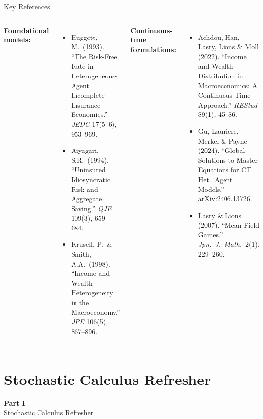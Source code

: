 \documentclass[aspectratio=169,11pt]{beamer}
\begin{document}
\begin{frame}{Key References}
\small
\begin{columns}[T]
\textbf{Foundational models:}
\begin{itemize}\itemsep2pt
    \item Huggett, M.\ (1993). ``The Risk-Free Rate in Heterogeneous-Agent Incomplete-Insurance Economies.'' \emph{JEDC} 17(5--6), 953--969.
    \item Aiyagari, S.R.\ (1994). ``Uninsured Idiosyncratic Risk and Aggregate Saving.'' \emph{QJE} 109(3), 659--684.
    \item Krusell, P.\ \& Smith, A.A.\ (1998). ``Income and Wealth Heterogeneity in the Macroeconomy.'' \emph{JPE} 106(5), 867--896.
\end{itemize}

\textbf{Continuous-time formulations:}
\begin{itemize}\itemsep2pt
    \item Achdou, Han, Lasry, Lions \& Moll (2022). ``Income and Wealth Distribution in Macroeconomics: A Continuous-Time Approach.'' \emph{REStud} 89(1), 45--86.
    \item Gu, Lauriere, Merkel \& Payne (2024). ``Global Solutions to Master Equations for CT Het.\ Agent Models.'' arXiv:2406.13726.
    \item Lasry \& Lions (2007). ``Mean Field Games.'' \emph{Jpn.\ J.\ Math.}\ 2(1), 229--260.
\end{itemize}
\end{columns}
\end{frame}


\section{Stochastic Calculus Refresher}

\begin{frame}{}
\vfill
\begin{center}
{\Huge \textcolor{uzhblue}{\textbf{Part I}}}\\[12pt]
{\LARGE Stochastic Calculus Refresher}
\end{center}
\vfill
\end{frame}
\end{document}
